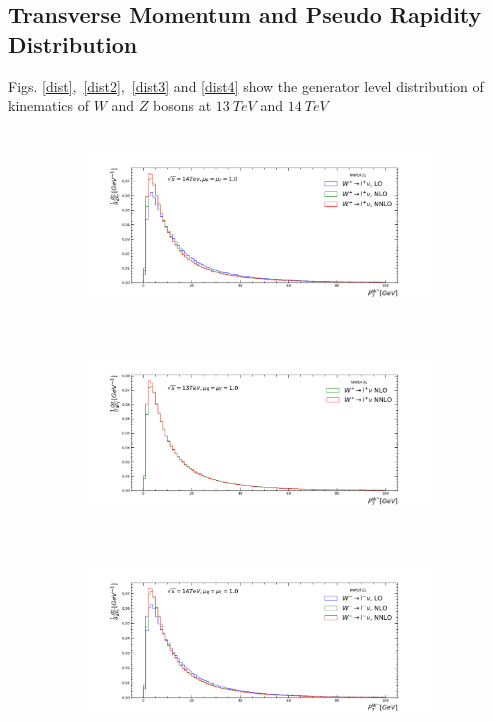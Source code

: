 \subsection{Transverse Momentum and Pseudo Rapidity Distribution}
Figs. \ref{dist},~\ref{dist2},~\ref{dist3} and \ref{dist4} show the generator level distribution of kinematics of $W$ and $Z$ bosons at $13~TeV$ and $14~TeV$
\begin{figure}[H]
\centering
\begin{subfigure}{0.49\textwidth}
\includegraphics[height=5cm ,width=\textwidth]{chapter4/Wpt_rf1_14.pdf}
\vspace*{-8mm}
\caption{}
\label{pt141}
\end{subfigure}
\begin{subfigure}{0.49\textwidth}
\includegraphics[height=5cm, width=\textwidth]{chapter4/Wppt_rf1_13.pdf}
\vspace*{-8mm}
\caption{}
\label{pt131}
\end{subfigure}
\begin{subfigure}{0.49\textwidth}
\includegraphics[height=5cm, width=\textwidth]{chapter4/Wmpt_rf1_14.pdf}

\end{subfigure}
\end{figure}
